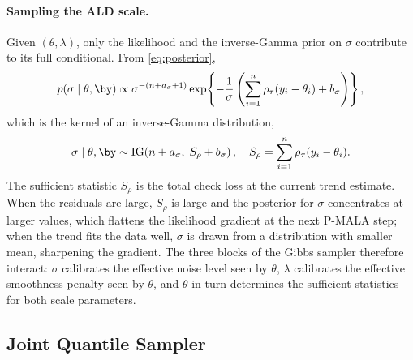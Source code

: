 \paragraph{Sampling the ALD scale.}
Given $(\theta, \lambda)$, only the likelihood and the inverse-Gamma prior on $\sigma$ contribute to its full conditional. From \eqref{eq:posterior},
\begin{align*}
    p(\sigma \mid \theta, \by) \propto
    \sigma^{-(n + a_\sigma + 1)}
    \exp\!\left\{-\frac{1}{\sigma}
    \left(\sum_{i=1}^n \rho_\tau(y_i - \theta_i) + b_\sigma\right)\right\},
\end{align*}
which is the kernel of an inverse-Gamma distribution,
\begin{equation}
    \sigma \mid \theta, \by \sim
    \mathrm{IG}\!\left(n + a_\sigma,\; S_\rho + b_\sigma\right),
    \quad S_\rho = \sum_{i=1}^n \rho_\tau(y_i - \theta_i).
    \label{eq:sigmaupdate}
\end{equation}
The sufficient statistic $S_\rho$ is the total check loss at the current trend estimate. When the residuals are large, $S_\rho$ is large and the posterior for $\sigma$ concentrates at larger values, which flattens the likelihood gradient at the next P-MALA step; when the trend fits the data well, $\sigma$ is drawn from a distribution with smaller mean, sharpening the gradient. The three blocks of the Gibbs sampler therefore interact: $\sigma$ calibrates the effective noise level seen by $\theta$, $\lambda$ calibrates the effective smoothness penalty seen by $\theta$, and $\theta$ in turn determines the sufficient statistics for both scale parameters.

\subsection{Joint Quantile Sampler}
\label{subsec:joint}

